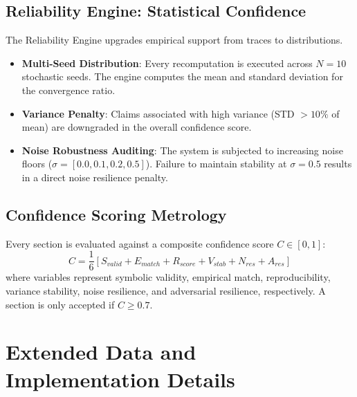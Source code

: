 \documentclass{article}
\begin{document}
\subsection{Reliability Engine: Statistical Confidence}
The Reliability Engine upgrades empirical support from traces to distributions.
\begin{itemize}
    \item \textbf{Multi-Seed Distribution}: Every recomputation is executed across $N=10$ stochastic seeds. The engine computes the mean and standard deviation for the convergence ratio.
    \item \textbf{Variance Penalty}: Claims associated with high variance (STD $> 10\%$ of mean) are downgraded in the overall confidence score.
    \item \textbf{Noise Robustness Auditing}: The system is subjected to increasing noise floors ($\sigma = [0.0, 0.1, 0.2, 0.5]$). Failure to maintain stability at $\sigma=0.5$ results in a direct noise resilience penalty.
\end{itemize}

\subsection{Confidence Scoring Metrology}
Every section is evaluated against a composite confidence score $C \in [0, 1]$:
\begin{equation}
    C = \frac{1}{6} \left[ S_{valid} + E_{match} + R_{score} + V_{stab} + N_{res} + A_{res} \right]
\end{equation}
where variables represent symbolic validity, empirical match, reproducibility, variance stability, noise resilience, and adversarial resilience, respectively. A section is only accepted if $C \ge 0.7$.

\newpage

\appendix

\section{Extended Data and Implementation Details}
\label{sec:appendix}
\end{document}

